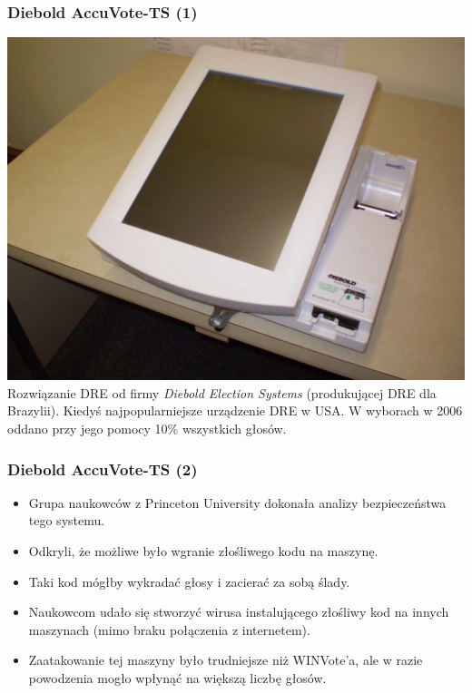 \documentclass{beamer}
\begin{document}
\begin{frame}
\frametitle{Diebold AccuVote-TS (1)}
\includegraphics[height=0.6\paperheight, center]{diebold} \\
Rozwiązanie DRE od firmy \textit{Diebold Election Systems} (produkującej DRE dla Brazylii). \pause Kiedyś najpopularniejsze urządzenie DRE w USA. W wyborach w 2006 oddano przy jego pomocy 10\% wszystkich głosów.
\end{frame}

\begin{frame}
\frametitle{Diebold AccuVote-TS (2)}
\begin{itemize}
\item Grupa naukowców z Princeton University dokonała analizy bezpieczeństwa tego systemu. \pause
\item Odkryli, że możliwe było wgranie złośliwego kodu na maszynę. \pause
\item Taki kod mógłby wykradać głosy i zacierać za sobą ślady. \pause
\item Naukowcom udało się stworzyć wirusa instalującego złośliwy kod na innych maszynach (mimo braku połączenia z internetem). \pause
\item Zaatakowanie tej maszyny było trudniejsze niż WINVote'a, ale w razie powodzenia mogło wpłynąć na większą liczbę głosów. 
\end{itemize}
\end{frame}
\end{document}
